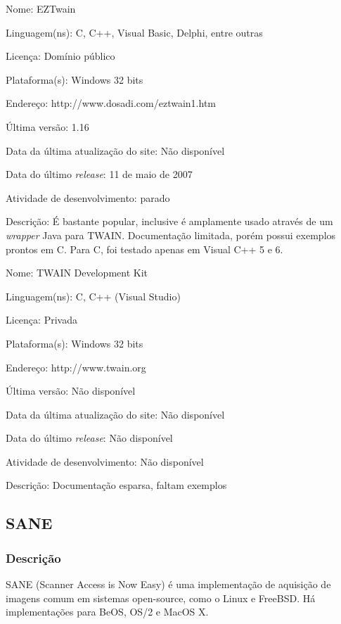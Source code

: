 \begin{description*}
	\item[Nome:] EZTwain
	\item[Linguagem(ns):] C, C++, Visual Basic, Delphi, entre outras
	\item[Licença:] Domínio público
	\item[Plataforma(s):] Windows 32 bits
	\item[Endereço:] http://www.dosadi.com/eztwain1.htm
	\item[Última versão:] 1.16
	\item[Data da última atualização do site:] Não disponível
	\item[Data do último {\it release}:] 11 de maio de 2007
	\item[Atividade de desenvolvimento:] parado
	\item[Descrição:] 
	É bastante popular, inclusive é amplamente usado através de um {\it wrapper} Java para TWAIN. Documentação limitada, porém possui exemplos prontos em C. Para C, foi testado apenas em Visual C++ 5 e 6.
\end{description*}

\begin{description*}
	\item[Nome:] TWAIN Development Kit
	\item[Linguagem(ns):] C, C++ (Visual Studio)
	\item[Licença:] Privada
	\item[Plataforma(s):] Windows 32 bits
	\item[Endereço:] http://www.twain.org
	\item[Última versão:] Não disponível
	\item[Data da última atualização do site:] Não disponível
	\item[Data do último {\it release}:] Não disponível
	\item[Atividade de desenvolvimento:] Não disponível
	\item[Descrição:] 
	Documentação esparsa, faltam exemplos
\end{description*}


\subsection{SANE}
\label{sec:sane}

\subsubsection{Descrição}
SANE (Scanner Access is Now Easy) é uma implementação de aquisição de imagens comum em sistemas open-source, como o Linux e FreeBSD. Há implementações para BeOS, OS/2 e MacOS X.


